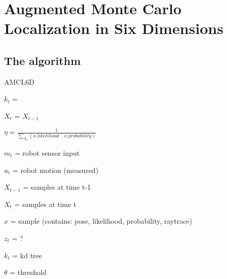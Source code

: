 \documentclass[Thesis.tex]{subfiles}
\begin{document}
\chapter{Augmented Monte Carlo Localization in Six Dimensions}

\section{The algorithm}

\begin{algorithm}
\label{alg:amcl6d}
\caption{AMCL6D}


 {

\BlankLine

$k_t$ = 

\BlankLine

$X_t$ = $X_{t-1}$\;

\BlankLine

$\eta = \frac{1}{ \sum\limits_{X_{t}}{\left( x.likelihood\ \cdot\ x.probability\right) } }$\;

\BlankLine


\BlankLine

\;


}

\end{algorithm}

$m_{t}$ = robot sensor input

$u_{t}$ = robot motion (measured)

$X_{t-1}$ = samples at time t-1

$X_{t}$ = samples at time t

$x$ = sample (contains: pose, likelihood, probability, raytrace)

$z_{t}$ = ?

$k_{t}$ = kd tree

$\theta$ = threshold
\end{document}
